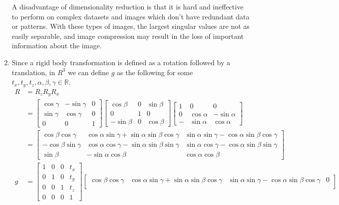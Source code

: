 \documentclass[12pt]{article}
\begin{document}
\begin{enumerate}
	A disadvantage of dimensionality reduction is that it is hard and ineffective to perform on complex datasets and images which don't have redundant data or patterns. With these types of images, the largest singular values are not as easily separable, and image compression may result in the loss of important information about the image.
	\item Since a rigid body transformation is defined as a rotation followed by a translation, in $R^3$ we can define $g$ as the following for some $t_x, t_y, t_z, \alpha, \beta, \gamma \in \mathbb{R}$.
	\begin{align*}
	R &= R_zR_yR_x \\
	&= 
	\begin{bmatrix} \cos\gamma & -\sin\gamma & 0 \\ \sin\gamma & \cos\gamma & 0 \\ 0 & 0 & 1 \end{bmatrix}
	\begin{bmatrix} \cos\beta & 0 & \sin\beta \\ 0 & 1 & 0 \\ -\sin\beta & 0 & \cos\beta \end{bmatrix} 
	\begin{bmatrix} 1 & 0 & 0 \\ 0 & \cos\alpha & -\sin\alpha \\ - & \sin\alpha & \cos\alpha \end{bmatrix} \\
	&= \begin{bmatrix}
	\cos\beta \cos\gamma & \cos\alpha \sin\gamma+ \sin\alpha \sin\beta \cos\gamma & \sin\alpha \sin\gamma - \cos\alpha \sin\beta \cos\gamma \\
	-\cos\beta \sin\gamma & \cos\alpha \cos\gamma - \sin\alpha \sin\beta \sin\gamma & \sin\alpha \cos\gamma - \cos\alpha \sin\beta \sin\gamma \\
	\sin\beta & -\sin\alpha \cos\beta & \cos\alpha\cos\beta
	\end{bmatrix}\\
	g &= \begin{bmatrix} 1 & 0 & 0 & t_x \\ 0 & 1 & 0 & t_y \\ 0 & 0 & 1 & t_z \\ 0 & 0 & 0 & 1 \end{bmatrix}\begin{bmatrix}
	\cos\beta \cos\gamma & \cos\alpha \sin\gamma+ \sin\alpha \sin\beta \cos\gamma & \sin\alpha \sin\gamma - \cos\alpha \sin\beta \cos\gamma & 0 \\

\end{bmatrix}
\end{align*}
\end{enumerate}
\end{document}
